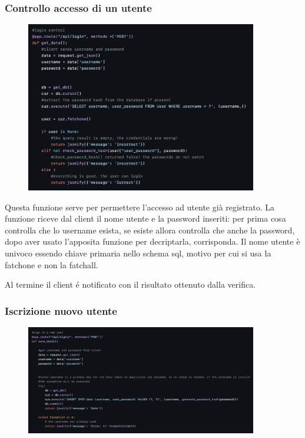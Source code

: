 \documentclass{article}
\begin{document}
\subsubsection{Controllo accesso di un utente}
\begin{figure}[H]
    \centering
    \includegraphics[width=0.9\textwidth]{images/controllo_login.png}
\end{figure}

Questa funzione serve per permettere l’accesso ad utente già registrato.
La funzione riceve dal client il nome utente e la password inseriti: per prima cosa controlla che lo username esista, se esiste allora controlla che anche la password, dopo aver usato l’apposita funzione per decriptarla, corrisponda.
Il nome utente è univoco essendo chiave primaria nello schema sql, motivo per cui si usa la fatchone e non la fatchall.

Al termine il client é notificato con il risultato ottenuto dalla verifica.

\subsubsection{Iscrizione nuovo utente}
\begin{figure}[H]
    \centering
    \includegraphics[width=0.9\textwidth]{images/iscrizione_nuovo_utente.png}
\end{figure}
\end{document}
